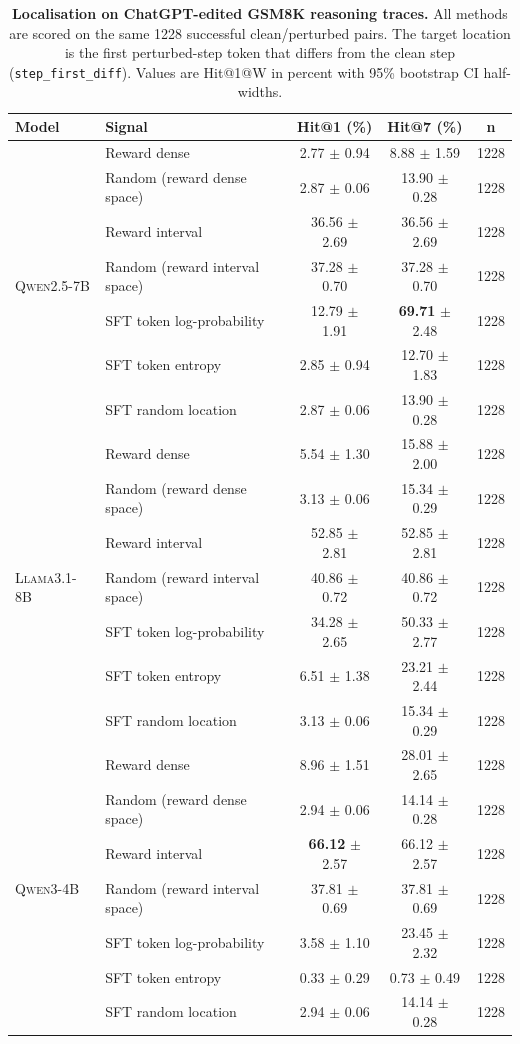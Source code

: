 \begin{table}[t]
\centering
\small
\setlength{\tabcolsep}{5pt}
\caption{\textbf{Localisation on ChatGPT-edited GSM8K reasoning traces.} All methods are scored on the same 1228 successful clean/perturbed pairs. The target location is the first perturbed-step token that differs from the clean step (\texttt{step\_first\_diff}). Values are Hit@1@W in percent with 95\% bootstrap CI half-widths.}
\label{tab:localisation_chatgpt_step_combined_hit1_hit7}
\begin{tabular}{llccc}
\toprule
\textbf{Model} & \textbf{Signal} & \textbf{Hit@1 (\%)} & \textbf{Hit@7 (\%)} & \textbf{n} \\
\midrule
\multirow{7}{*}{\textsc{Qwen2.5-7B}} & Reward dense & 2.77 $\pm$ 0.94 & 8.88 $\pm$ 1.59 & 1228 \\
 & Random (reward dense space) & 2.87 $\pm$ 0.06 & 13.90 $\pm$ 0.28 & 1228 \\
 & Reward interval & 36.56 $\pm$ 2.69 & 36.56 $\pm$ 2.69 & 1228 \\
 & Random (reward interval space) & 37.28 $\pm$ 0.70 & 37.28 $\pm$ 0.70 & 1228 \\
 & SFT token log-probability & 12.79 $\pm$ 1.91 & \textbf{69.71} $\pm$ 2.48 & 1228 \\
 & SFT token entropy & 2.85 $\pm$ 0.94 & 12.70 $\pm$ 1.83 & 1228 \\
 & SFT random location & 2.87 $\pm$ 0.06 & 13.90 $\pm$ 0.28 & 1228 \\
\midrule
\multirow{7}{*}{\textsc{Llama3.1-8B}} & Reward dense & 5.54 $\pm$ 1.30 & 15.88 $\pm$ 2.00 & 1228 \\
 & Random (reward dense space) & 3.13 $\pm$ 0.06 & 15.34 $\pm$ 0.29 & 1228 \\
 & Reward interval & 52.85 $\pm$ 2.81 & 52.85 $\pm$ 2.81 & 1228 \\
 & Random (reward interval space) & 40.86 $\pm$ 0.72 & 40.86 $\pm$ 0.72 & 1228 \\
 & SFT token log-probability & 34.28 $\pm$ 2.65 & 50.33 $\pm$ 2.77 & 1228 \\
 & SFT token entropy & 6.51 $\pm$ 1.38 & 23.21 $\pm$ 2.44 & 1228 \\
 & SFT random location & 3.13 $\pm$ 0.06 & 15.34 $\pm$ 0.29 & 1228 \\
\midrule
\multirow{7}{*}{\textsc{Qwen3-4B}} & Reward dense & 8.96 $\pm$ 1.51 & 28.01 $\pm$ 2.65 & 1228 \\
 & Random (reward dense space) & 2.94 $\pm$ 0.06 & 14.14 $\pm$ 0.28 & 1228 \\
 & Reward interval & \textbf{66.12} $\pm$ 2.57 & 66.12 $\pm$ 2.57 & 1228 \\
 & Random (reward interval space) & 37.81 $\pm$ 0.69 & 37.81 $\pm$ 0.69 & 1228 \\
 & SFT token log-probability & 3.58 $\pm$ 1.10 & 23.45 $\pm$ 2.32 & 1228 \\
 & SFT token entropy & 0.33 $\pm$ 0.29 & 0.73 $\pm$ 0.49 & 1228 \\
 & SFT random location & 2.94 $\pm$ 0.06 & 14.14 $\pm$ 0.28 & 1228 \\
\bottomrule
\end{tabular}
\end{table}
